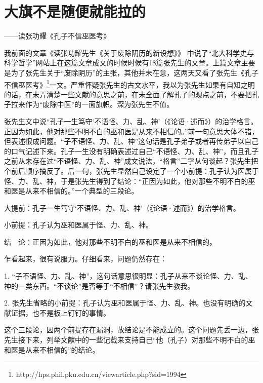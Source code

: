 \section{大旗不是随便就能拉的}
\centerline{
	\yuesong ——读张功耀《孔子不信巫医考》
}

\mbox{}

我前面的文章《读张功耀先生《关于废除阴历的新设想》》 中说了“北大科学史与科学哲学”网站上在这篇文章成文的时候时候有18篇张先生的文章。上篇文章主要是为了张先生关于“废除阴历”的主张，其他并未在意，这两天又看了张先生《孔子不信巫医考》\footnote{http://hps.phil.pku.edu.cn/viewarticle.php?sid=1994}一文。严重怀疑张先生的古文水平，我以为张先生如果有自知之明的话，在未弄清楚一些文献的意思之前，在未全面了解孔子的观点之前，不要把孔子拉来作为“废除中医”的一面旗帜。深为张先生不值。

张先生文中说“孔子一生笃守‘不语怪、力、乱、神’（《论语·述而》）的治学格言。正因为如此，他对那些不明不白的巫和医是从来不相信的。”前一句意思大体不错，但表述很成问题。“子不语怪、力、乱、神”这句话是孔子弟子或者再传弟子以自己的口气记述下来。孔子一生没有明确表述过自己“不语怪、力、乱、神”，而且孔子之前从未存在过“不语怪、力、乱、神”成文说法，“格言”二字从何谈起？张先生把个前后顺序搞反了。后一句，张先生显然自己设定了一个小前提：孔子认为医属于怪、力、乱、神，于是张先生得到了结论：“正因为如此，他对那些不明不白的巫和医是从来不相信的。”一个典型的三段论。

大提前：孔子一生笃守‘不语怪、力、乱、神’（《论语·述而》）的治学格言。

小前提：孔子认为巫和医属于怪、力、乱、神。

结~~论：正因为如此，他对那些不明不白的巫和医是从来不相信的。

乍看起来，很有说服力。仔细看来，问题仍然存在：

1.  “子不语怪、力、乱、神”，这句话意思很明显：孔子从来不谈论怪、力、乱、神的一类东西。“不谈论”是否等于“不相信”？请张先生教我。

2.  张先生省略的小前提：孔子认为巫和医属于怪、力、乱、神。也没有明确的文献证据，也不是板上钉钉的事情。

这个三段论，因两个前提存在漏洞，故结论是不能成立的。这个问题先丢一边，张先生接下来，列举文献中的一些记载来支持自己“他（孔子）对那些不明不白的巫和医是从来不相信的”的结论。

